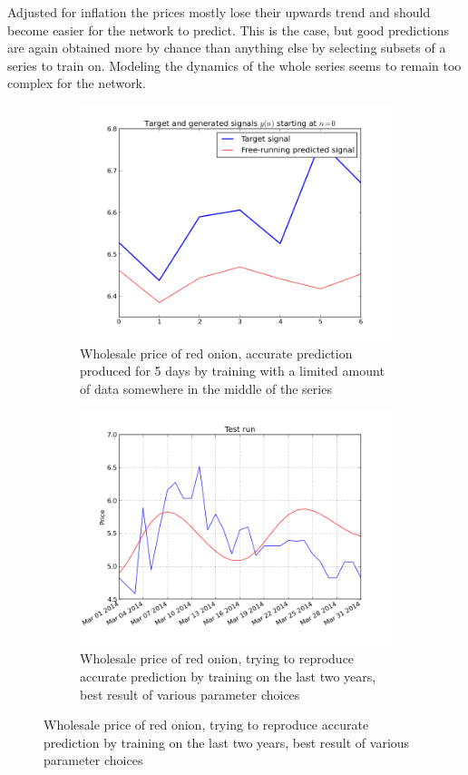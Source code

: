 Adjusted for inflation the prices mostly lose their upwards trend and should become easier for the network to predict. This is the case, but good predictions are again obtained more by chance than anything else by selecting subsets of a series to train on. Modeling the dynamics of the whole series seems to remain too complex for the network.

\begin{figure}[!ht]
    \centering
        \begin{subfigure}[b]{.45\textwidth}
        \centering
        \includegraphics[width=\textwidth]{./img/plots/esn/red_onion_pred_6d_batch.png}
        \caption{Wholesale price of red onion, accurate prediction produced for 5 days by training with a limited amount of data somewhere in the middle of the series}
        \label{subfig:res_ch6d}
        \end{subfigure}
        \quad
        \begin{subfigure}[b]{.45\textwidth}
        \centering
        \includegraphics[width=\textwidth]{./img/plots/esn/red_onion_initN3000_30d.png}
        \caption{Wholesale price of red onion, trying to reproduce accurate prediction by training on the last two years, best result of various parameter choices}
        \label{subfig:res_ch30d}
        \end{subfigure}


\end{figure}

